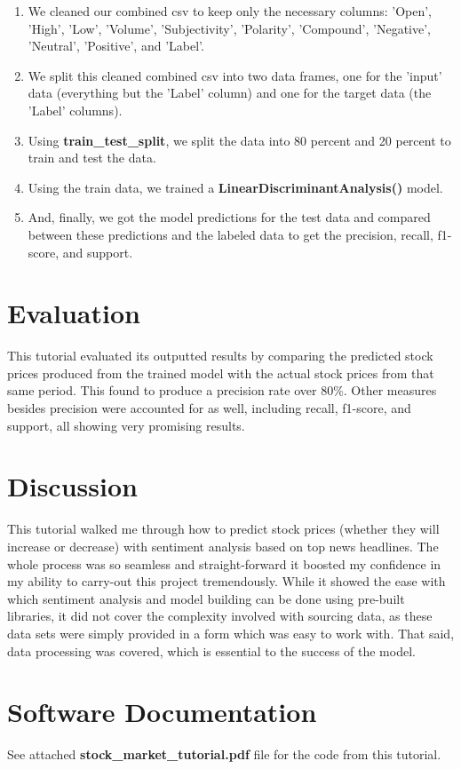 \documentclass[10pt,twocolumn]{article}
\begin{document}
\begin{enumerate}
    \item We cleaned our combined csv to keep only the necessary columns: 'Open', 'High', 'Low', 'Volume', 'Subjectivity', 'Polarity', 'Compound', 'Negative', 'Neutral', 'Positive', and 'Label'.
    \item We split this cleaned combined csv into two data frames, one for the 'input' data (everything but the 'Label' column) and one for the target data (the 'Label' columns).
    \item Using \textbf{train\_test\_split}, we split the data into 80 percent and 20 percent to train and test the data.
    \item Using the train data, we trained a \textbf{LinearDiscriminantAnalysis()} model.
    \item And, finally, we got the model predictions for the test data and compared between these predictions and the labeled data to get the precision, recall, f1-score, and support.
\end{enumerate}


\section{Evaluation}

This tutorial evaluated its outputted results by comparing the predicted stock prices produced from the trained model with the actual stock prices from that same period. This found to produce a precision rate over 80\%. Other measures besides precision were accounted for as well, including recall, f1-score, and support, all showing very promising results.

\section{Discussion}

This tutorial walked me through how to predict stock prices (whether they will increase or decrease) with sentiment analysis based on top news headlines. The whole process was so seamless and straight-forward it boosted my confidence in my ability to carry-out this project tremendously. While it showed the ease with which sentiment analysis and model building can be done using pre-built libraries, it did not cover the complexity involved with sourcing data, as these data sets were simply provided in a form which was easy to work with. That said, data processing was covered, which is essential to the success of the model.

\section{Software Documentation}

See attached \textbf{stock\_market\_tutorial.pdf} file for the code from this tutorial.


\printbibliography 
\end{document}
